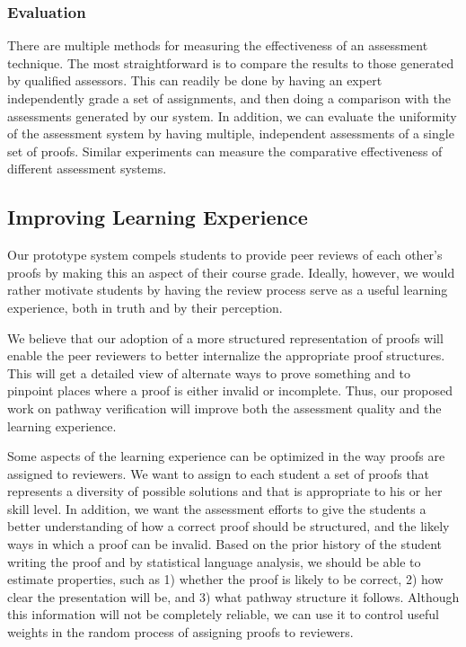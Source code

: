 \documentclass[12pt]{article}
\begin{document}
\subsubsection*{Evaluation}

There are multiple methods for measuring the effectiveness of an
assessment technique.  The most straightforward is to compare the
results to those generated by qualified assessors.  This can readily
be done by having an expert independently grade a set of
assignments, and then doing a comparison with the assessments
generated by our system.  In addition, we can evaluate the uniformity
of the assessment system by having multiple, independent assessments
of a single set of proofs.  Similar experiments can measure the
comparative effectiveness of different assessment systems.

\subsection{Improving Learning Experience}

Our prototype system compels students to provide peer reviews of each
other's proofs by making this an aspect of their course grade.
Ideally, however, we would
rather motivate students by having the review process serve as a useful
learning experience, both in truth and by their perception.

We believe that our adoption of a more structured representation of
proofs will enable the peer reviewers to better internalize the
appropriate proof structures.  This will get a detailed view of
alternate ways to prove something and to pinpoint places where a proof
is either invalid or incomplete.  Thus, our proposed work on pathway
verification will improve both the assessment quality and the learning
experience. 

Some aspects of the learning experience can be optimized in the way
proofs are assigned to reviewers.  We want to assign to each student
a set of proofs that represents a diversity of possible solutions and
that is appropriate to his or her skill level.  In addition, we want
the assessment efforts to give the students a better understanding of
how a correct proof should be structured, and the likely ways in which
a proof can be invalid.
Based on the
prior history of the student writing the proof and by statistical
language analysis, we should be able to estimate properties, such as
1) whether the proof is likely to be correct, 2) how clear the presentation
will be, and 3) what pathway structure it follows.  Although this
information will not be completely reliable, we can use it to control
useful weights in the random process of assigning proofs to reviewers.
\end{document}
